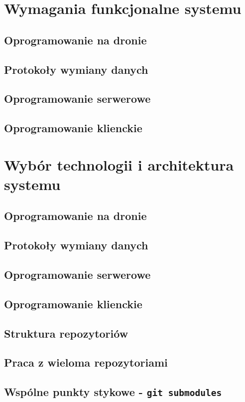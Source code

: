 \chapter{Wymagania funkcjonalne systemu}

\section{Oprogramowanie na dronie}
\section{Protokoły wymiany danych}
\section{Oprogramowanie serwerowe}
\section{Oprogramowanie klienckie}


\chapter{Wybór technologii i architektura systemu}

\section{Oprogramowanie na dronie}
\section{Protokoły wymiany danych}
\section{Oprogramowanie serwerowe}
\section{Oprogramowanie klienckie}

\section{Struktura repozytoriów}
\section{Praca z wieloma repozytoriami}
\section{Wspólne punkty stykowe - \texttt{git submodules}}

